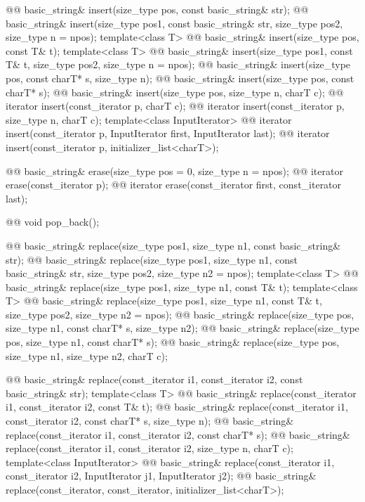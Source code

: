 \documentclass{wg21}
\begin{document}
\begin{codeblock}
{{    @@ basic_string& insert(size_type pos, const basic_string& str);
    @@ basic_string& insert(size_type pos1, const basic_string& str,
                                             size_type pos2, size_type n = npos);
    template<class T>
      @@ basic_string& insert(size_type pos, const T& t);
    template<class T>
      @@ basic_string& insert(size_type pos1, const T& t, size_type pos2, size_type n = npos);
    @@ basic_string& insert(size_type pos, const charT* s, size_type n);
    @@ basic_string& insert(size_type pos, const charT* s);
    @@ basic_string& insert(size_type pos, size_type n, charT c);
    @@ iterator insert(const_iterator p, charT c);
    @@ iterator insert(const_iterator p, size_type n, charT c);
    template<class InputIterator>
      @@ iterator insert(const_iterator p, InputIterator first, InputIterator last);
    @@ iterator insert(const_iterator p, initializer_list<charT>);

    @@ basic_string& erase(size_type pos = 0, size_type n = npos);
    @@ iterator erase(const_iterator p);
    @@ iterator erase(const_iterator first, const_iterator last);

    @@ void pop_back();

    @@ basic_string& replace(size_type pos1, size_type n1, const basic_string& str);
    @@ basic_string& replace(size_type pos1, size_type n1, const basic_string& str,
                                              size_type pos2, size_type n2 = npos);
    template<class T>
      @@ basic_string& replace(size_type pos1, size_type n1, const T& t);
    template<class T>
      @@ basic_string& replace(size_type pos1, size_type n1, const T& t,
                                                size_type pos2, size_type n2 = npos);
    @@ basic_string& replace(size_type pos, size_type n1, const charT* s, size_type n2);
    @@ basic_string& replace(size_type pos, size_type n1, const charT* s);
    @@ basic_string& replace(size_type pos, size_type n1, size_type n2, charT c);

    @@ basic_string& replace(const_iterator i1, const_iterator i2, const basic_string& str);
    template<class T>
      @@ basic_string& replace(const_iterator i1, const_iterator i2, const T& t);
    @@ basic_string& replace(const_iterator i1, const_iterator i2, const charT* s, size_type n);
    @@ basic_string& replace(const_iterator i1, const_iterator i2, const charT* s);
    @@ basic_string& replace(const_iterator i1, const_iterator i2, size_type n, charT c);
    template<class InputIterator>
      @@ basic_string& replace(const_iterator i1, const_iterator i2,
                                                InputIterator j1, InputIterator j2);
    @@ basic_string& replace(const_iterator, const_iterator, initializer_list<charT>);

}}
\end{codeblock}
\end{document}
